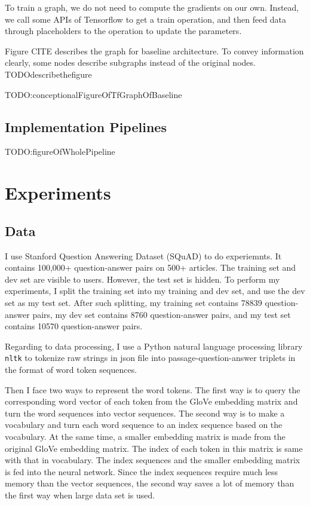 \documentclass[modernstyle,12pt]{sjsuthesis}
\theoremstyle{definition}
\begin{document}
To train a graph, we do not need to compute the gradients on our own. Instead, we call some APIs of Tensorflow to get a train operation, and then feed data through placeholders to the operation to update the parameters.



Figure CITE describes the graph for baseline architecture. To convey information clearly, some nodes describe subgraphs instead of the original nodes. TODOdescribethefigure

TODO:conceptionalFigureOfTfGraphOfBaseline




\section{Implementation Pipelines}

TODO:figureOfWholePipeline

\chapter{Experiments}
\section{Data}
I use Stanford Question Answering Dataset (SQuAD) to do experiemnts.  It contains 100,000+ question-answer pairs on 500+ articles. The training set and dev set are visible to users. However, the test set is hidden. To perform my experiments, I split the training set into my training and dev set, and use the dev set as my test set. After such splitting, my training set contains 78839 question-answer pairs, my dev set contains 8760 question-answer pairs, and my test set contains 10570 question-answer pairs.

 Regarding to data processing, I use a Python natural language processing library {\tt nltk} to tokenize raw strings in json file into passage-question-answer triplets in the format of word token sequences.

Then I face two ways to represent the word tokens. The first way is to query the corresponding word vector of each token from the GloVe embedding matrix and turn the word sequences into vector sequences.  The second way is to make a vocabulary and turn each word sequence to an index sequence based on the vocabulary. At the same time, a smaller embedding matrix is made from the original GloVe embedding matrix. The index of each token in this matrix is same with that in vocabulary. The index sequences and the smaller embedding matrix is fed into the neural network. Since the index sequences require much less memory than the vector sequences, the second way saves a lot of memory than the first way when large data set is used.
\end{document}
